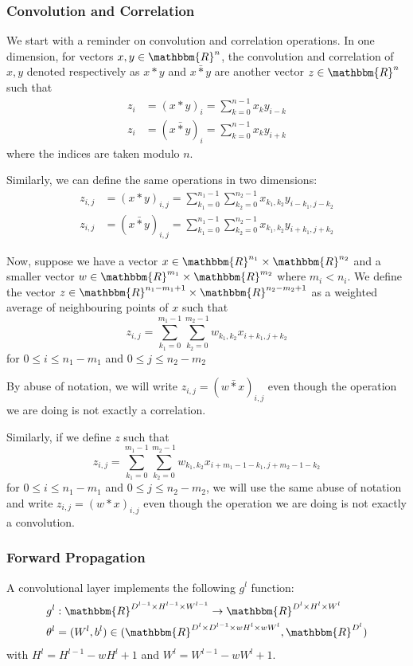 \documentclass{article} %
\begin{document}
\subsubsection{Convolution and Correlation}
We start with a reminder on convolution and correlation operations. In one dimension, for vectors $x,y \in \mathbbm{R}^n$, the convolution and correlation of $x,y$ denoted respectively as $x \ast y$ and $x \bar{\ast} y$ are another vector $z \in \mathbbm{R}^n$ such that
$$
\begin{aligned}
z_i &= (x\ast y)_i = \sum_{k=0}^{n-1} x_k y_{i-k}  \\
z_i &= (x \bar{\ast} y)_i = \sum_{k=0}^{n-1} x_k y_{i+k} 
\end{aligned}
$$
where the indices are taken modulo $n$.

Similarly, we can define the same operations in two dimensions:
$$
\begin{aligned}
z_{i,j} &= (x\ast y)_{i,j} = \sum_{k_1=0}^{n_1-1}\sum_{k_2=0}^{n_2-1} x_{k_1, k_2} y_{i-k_1,j-k_2}  \\
z_{i,j} &= (x \bar{\ast} y)_{i,j} = \sum_{k_1=0}^{n_1-1}\sum_{k_2=0}^{n_2-1} x_{k_1, k_2} y_{i+k_1,j+k_2} 
\end{aligned}
$$

Now, suppose we have a vector $x\in \mathbbm{R}^{n_1} \times \mathbbm{R}^{n_2}$ and a smaller vector $w \in \mathbbm{R}^{m_1} \times \mathbbm{R}^{m_2}$ where $m_i<n_i$. We define the vector $z\in  \mathbbm{R}^{n_1-m_1+1} \times \mathbbm{R}^{n_2-m_2+1}$ as a weighted average of neighbouring points of $x$ such that
$$
z_{i,j} = \sum_{k_1=0}^{m_1-1}\sum_{k_2=0}^{m_2-1} w_{k_1,k_2} x_{i+k_1, j+k_2}
$$
for $0 \leq i \leq n_1-m_1$ and $0 \leq j \leq n_2-m_2$

By abuse of notation, we will write $z_{i,j} = (w \bar{\ast} x)_{i,j}$ even though the operation we are doing is not exactly a correlation. 

Similarly, if we define $z$ such that
$$
z_{i,j} = \sum_{k_1=0}^{m_1-1}\sum_{k_2=0}^{m_2-1} w_{k_1,k_2} x_{i+m_1-1-k_1, j+m_2-1-k_2}
$$
for $0\leq i \leq n_1-m_1$ and $0 \leq j \leq n_2-m_2$, we will use the same abuse of notation and write $z_{i,j} = (w \ast x)_{i,j}$ even though the operation we are doing is not exactly a convolution.

\subsubsection{Forward Propagation}
A convolutional layer implements the following $g^l$ function:
$$
\begin{aligned}
&g^l : \mathbbm{R}^{D^{l-1}\times H^{l-1} \times W^{l-1}} \rightarrow \mathbbm{R}^{D^l \times H^l \times W^l} \\
&\theta^l = (W^l, b^l) \in (\mathbbm{R}^{D^l \times D^{l-1} \times wH^l \times wW^l}, \mathbbm{R}^{D^l})
\end{aligned}
$$
with $H^{l} = H^{l-1}-wH^l+1$ and $W^l = W^{l-1}-wW^l+1$. 
\end{document}

